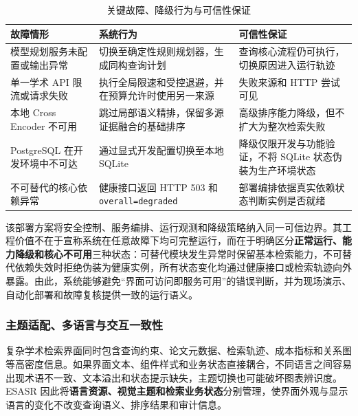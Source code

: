 \documentclass[a4paper,12pt,fontset=none]{ctexart}
\begin{document}
\begin{table}[H]
	\centering
	\caption{关键故障、降级行为与可信性保证}
	\label{tab:failure-degradation}
	\begin{tabularx}{\textwidth}{C{3.0cm} Y Y}
		\toprule
		\textbf{故障情形} & \textbf{系统行为} & \textbf{可信性保证} \\
		\midrule
		模型规划服务未配置或输出异常
		& 切换至确定性规则规划器，生成同构查询计划
		& 查询核心流程仍可执行，切换原因进入运行轨迹 \\
		
		单一学术 API 限流或请求失败
		& 执行全局限速和受控退避，并在预算允许时使用另一来源
		& 失败来源和 HTTP 尝试可见 \\
		
		本地 Cross Encoder 不可用
		& 跳过局部语义精排，保留多源证据融合的基础排序
		& 高级排序能力降级，但不扩大为整次检索失败 \\
		
		PostgreSQL 在开发环境中不可达
		& 通过显式开发配置切换至本地 SQLite
		& 降级仅限开发与功能验证，不将 SQLite 状态伪装为生产环境状态 \\
		
		不可替代的核心依赖异常
		& 健康接口返回 HTTP 503 和 \texttt{overall=degraded}
		& 部署编排依据真实依赖状态判断实例是否就绪 \\
		\bottomrule
	\end{tabularx}
\end{table}

该部署方案将安全控制、服务编排、运行观测和降级策略纳入同一可信边界。其工程价值不在于宣称系统在任意故障下均可完整运行，而在于明确区分\textbf{正常运行、能力降级和核心不可用}三种状态：可替代模块发生异常时保留基本检索能力，不可替代依赖失效时拒绝伪装为健康实例，所有状态变化均通过健康接口或检索轨迹向外暴露。由此，系统能够避免“界面可访问即服务可用”的错误判断，并为现场演示、自动化部署和故障复核提供一致的运行语义。

\subsubsection{主题适配、多语言与交互一致性}

复杂学术检索界面同时包含查询约束、论文元数据、检索轨迹、成本指标和关系图等高密度信息。如果界面文本、组件样式和业务状态直接耦合，不同语言之间容易出现术语不一致、文本溢出和状态提示缺失，主题切换也可能破坏图表辨识度。ESASR 因此将\textbf{语言资源、视觉主题和检索业务状态}分别管理，使界面外观与显示语言的变化不改变查询语义、排序结果和审计信息。
\end{document}
